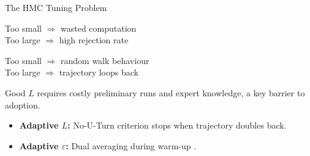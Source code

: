 \documentclass{beamer}
\begin{document}
\begin{frame}{The HMC Tuning Problem}
  \noindent
  \begin{minipage}[t]{0.49\textwidth}
    \begin{tcolorbox}[warnbox, title=Step size $\varepsilon$, height=2.8cm]
      \small
      Too small $\Rightarrow$ wasted computation\\[3pt]
      Too large $\Rightarrow$ high rejection rate
    \end{tcolorbox}
  \end{minipage}
  \hfill
  \begin{minipage}[t]{0.49\textwidth}
    \begin{tcolorbox}[warnbox, title=Leapfrog steps $L$, height=2.8cm]
      \small
      Too small $\Rightarrow$ random walk behaviour\\[3pt]
      Too large $\Rightarrow$ trajectory loops back
    \end{tcolorbox}
  \end{minipage}

  \vspace{0.2cm}
  Good $L$ requires costly preliminary runs and expert knowledge, a key barrier to adoption.

  \vspace{0.2cm}
  \begin{tcolorbox}[keybox, title=NUTS addresses both \cite{main}]
    \begin{itemize}
      \item \textbf{Adaptive $L$:} No-U-Turn criterion stops when trajectory doubles back.
      \item \textbf{Adaptive $\varepsilon$:} Dual averaging during warm-up \cite{nesterov2009primal}.
    \end{itemize}
  \end{tcolorbox}
\end{frame}
\end{document}
